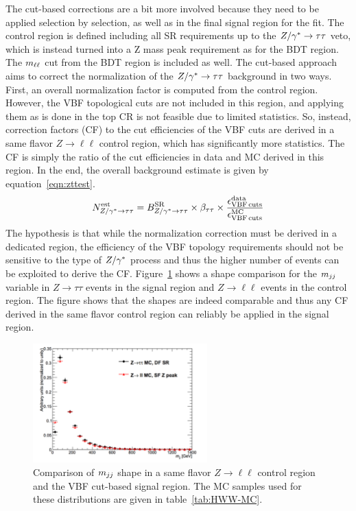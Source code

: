 The cut-based corrections are a bit more involved because they need to be applied selection by selection, as well as in the final signal region for the fit. The control region is defined including all SR requirements up to the $Z/\gamma^{\ast} \to \tau\tau$ veto, which is instead turned into a Z mass peak requirement as for the BDT region. The $m_{\ell\ell}$ cut from the BDT region is included as well. The cut-based approach aims to correct the normalization of the $Z/\gamma^{\ast} \to\tau\tau$ background in two ways. First, an overall normalization factor is computed from the control region. However, the VBF topological cuts are not included in this region, and applying them as is done in the top CR is not feasible due to limited statistics. So, instead, correction factors (CF) to the cut efficiencies of the VBF cuts are derived in a same flavor $Z\to\ell\ell$ control region, which has significantly more statistics. The CF is simply the ratio of the cut efficiencies in data and MC derived in this region. In the end, the overall background estimate is given by equation~\ref{eqn:zttest}.
%
\begin{equation}
N^{\rm est}_{Z/\gamma^{\ast} \to \tau\tau} = B^{\rm SR}_{Z/\gamma^{\ast} \to \tau\tau} \times \beta_{\tau\tau} \times \frac{\epsilon_{\rm VBF\,cuts}^{\rm data}}{\epsilon_{\rm VBF\,cuts}^{\rm MC}} 
\label{eqn:zttest}
\end{equation}
%
The hypothesis is that while the normalization correction must be derived in a dedicated region, the efficiency of the VBF topology requirements should not be sensitive to the type of $Z/\gamma^{\ast}$ process and thus the higher number of events can be exploited to derive the CF. Figure~\ref{fig:vbf_ztt_comp} shows a shape comparison for the $m_{jj}$ variable in $Z\to\tau\tau$ events in the signal region and $Z\to\ell\ell$ events in the control region. The figure shows that the shapes are indeed comparable and thus any CF derived in the same flavor control region can reliably be applied in the signal region. 

\begin{figure}[h!]
  \centering
  \captionsetup{justification=centering}
  \includegraphics[width=0.6\textwidth]{figures/VBF_DYtt_shape_comp}
  \caption{Comparison of $m_{jj}$ shape in a same flavor $Z\to\ell\ell$ control region and the VBF cut-based signal region. The MC samples used for these distributions are given in table~\ref{tab:HWW-MC}.}
  \label{fig:vbf_ztt_comp}
\end{figure}


